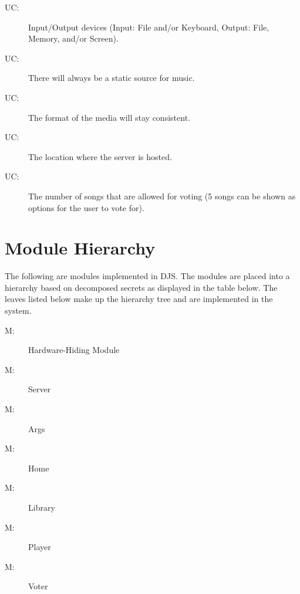 \documentclass[12pt, titlepage]{article}
\newcounter{ucnum}
\newcommand{\uctheucnum}{UC\theucnum}
\newcounter{mnum}
\newcommand{\mthemnum}{M\themnum}
\begin{document}
\begin{description}
\item[ \uctheucnum \label{ucIO}:] Input/Output devices
 (Input: File and/or Keyboard, Output: File, Memory, and/or Screen).
\item[ \uctheucnum \label{ucInput}:] There will always be a static source for music.
\item[ \uctheucnum \label{ucInput}:] The format of the media will stay consistent.
\item[ \uctheucnum \label{ucInput}:] The location where the server is hosted.
\item[ \uctheucnum \label{ucInput}:] The number of songs that are allowed for voting (5 songs can be shown as options for the user to vote for).
\end{description}


\section{Module Hierarchy} \label{SecMH}
The following are modules implemented in DJS. The modules are placed into a hierarchy based on decomposed secrets as displayed in the table below. The leaves listed below make up the hierarchy tree and are implemented in the system.


\begin{description}
\item [ \mthemnum \label{mHH}:] Hardware-Hiding Module
\item [ \mthemnum \label{mSR}:] Server
\item [ \mthemnum \label{mAS}:] Args 
\item [ \mthemnum \label{mDO}:] Home
\item [ \mthemnum \label{mLM}:] Library
\item [ \mthemnum \label{mPM}:] Player
\item [ \mthemnum \label{mIV}:] Voter

\end{description}
\end{document}
